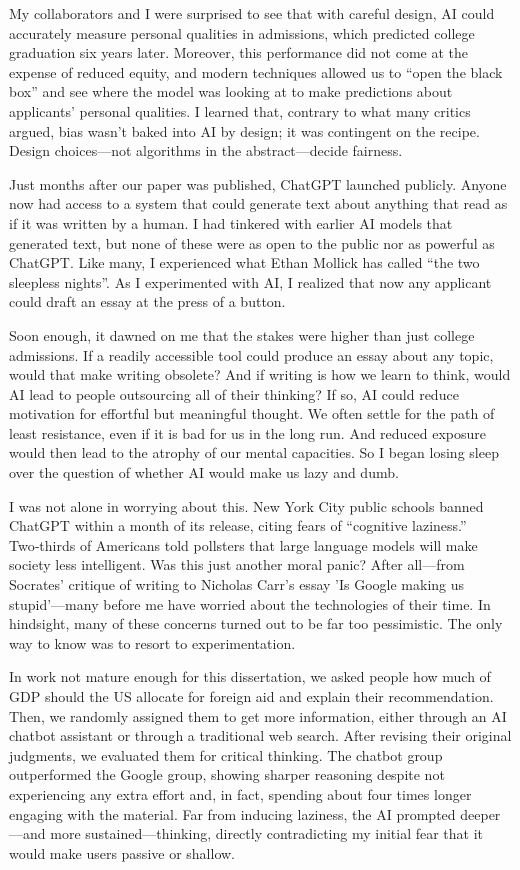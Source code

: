 \documentclass[11pt]{report}
\begin{document}
\begin{mainf}
My collaborators and I were surprised to see that with careful design, AI could accurately measure personal qualities in admissions, which predicted college graduation six years later. 
Moreover, this performance did not come at the expense of reduced equity, and modern techniques allowed us to “open the black box” and see where the model was looking at to make predictions about applicants' personal qualities. 
I learned that, contrary to what many critics argued, bias wasn’t baked into AI by design; it was contingent on the recipe. 
Design choices—not algorithms in the abstract—decide fairness.

Just months after our paper was published, ChatGPT launched publicly.
Anyone now had access to a system that could generate text about anything that read as if it was written by a human. 
I had tinkered with earlier AI models that generated text, but none of these were as open to the public nor as powerful as ChatGPT. 
Like many, I experienced what Ethan Mollick has called “the two sleepless nights”. 
As I experimented with AI, I realized that now any applicant could draft an essay at the press of a button.

Soon enough, it dawned on me that the stakes were higher than just college admissions. 
If a readily accessible tool could produce an essay about any topic, would that make writing obsolete? 
And if writing is how we learn to think, would AI lead to people outsourcing all of their thinking? 
If so, AI could reduce motivation for effortful but meaningful thought. 
We often settle for the path of least resistance, even if it is bad for us in the long run. 
And reduced exposure would then lead to the atrophy of our mental capacities. 
So I began losing sleep over the question of whether AI would make us lazy and dumb.

I was not alone in worrying about this. 
New York City public schools banned ChatGPT within a month of its release, citing fears of “cognitive laziness.” 
Two‑thirds of Americans told pollsters that large language models will make society less intelligent. 
Was this just another moral panic? 
After all—from Socrates’ critique of writing to Nicholas Carr’s essay 'Is Google making us stupid’—many before me have worried about the technologies of their time. 
In hindsight, many of these concerns turned out to be far too pessimistic. 
The only way to know was to resort to experimentation.

In work not mature enough for this dissertation, we asked people how much of GDP should the US allocate for foreign aid and explain their recommendation. 
Then, we randomly assigned them to get more information, either through an AI chatbot assistant or through a traditional web search. 
After revising their original judgments, we evaluated them for critical thinking. 
The chatbot group outperformed the Google group, showing sharper reasoning despite not experiencing any extra effort and, in fact, spending about four times longer engaging with the material. 
Far from inducing laziness, the AI prompted deeper—and more sustained—thinking, directly contradicting my initial fear that it would make users passive or shallow.


\end{mainf}
\end{document}
